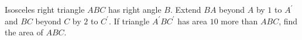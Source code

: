Isosceles right triangle $ABC$ has right angle $B$. Extend $BA$ beyond $A$ by $1$ to $A^{\prime}$ and $BC$ beyond $C$ by $2$ to $C^{\prime}$. If triangle $A^{\prime}BC^{\prime}$ has area $10$ more than $ABC$, find the area of $ABC$.
